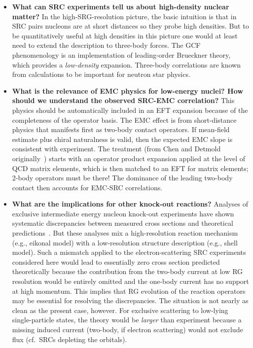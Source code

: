 \documentclass[10pt,aps,prc,floatfix,twocolumn,nofootinbib]{revtex4-1}
\begin{document}
\begin{itemize}
  \item\textbf{What can SRC experiments tell us about high-density nuclear matter?}
  In the high-SRG-resolution picture, the basic intuition is that in SRC pairs nucleons are at short distances so they probe high densities.
  But to be quantitatively useful at high densities in this picture one would at least need to extend the description to three-body forces.
  The GCF phenomenology is an implementation of leading-order Brueckner theory, which provides a \emph{low-density} expansion.
  Three-body correlations are known from calculations to be important for neutron star physics.
  
  \item\textbf{What is the relevance of EMC physics for low-energy nuclei? How should we understand the observed SRC-EMC correlation?} 
  This physics should be automatically included in an EFT expansion because of the completeness of the operator basis. 
  The EMC effect is from short-distance physics that manifests first as two-body contact operators. 
  If mean-field estimate plus chiral naturalness is valid, then the expected EMC slope is consistent with experiment. The treatment (from Chen and Detmold originally~\cite{Chen:2004zx,Chen:2016bde,Lynn:2019vwp}) starts with an operator product expansion applied at the level of QCD matrix elements, which is then matched to an EFT for matrix elements; 2-body operators must be there! 
  The dominance of the leading two-body contact then accounts for EMC-SRC correlations. 
  
  \item\textbf{What are the implications for other knock-out reactions?}
  Analyses of exclusive intermediate energy nucleon knock-out experiments have shown systematic discrepancies between measured cross sections and theoretical predictions~\cite{Tostevin:2014usa,Aumann:2020tcq}.
  But these analyses mix a high-resolution reaction mechanism (e.g., eikonal model) with a low-resolution structure description (e.g., shell model).
  Such a mismatch applied to the electron-scattering SRC experiments considered here would lead to essentially zero cross section predicted theoretically because the contribution from the two-body current at low RG resolution would be entirely omitted and the one-body current has no support at high momentum.
  This implies that RG evolution of the reaction operators may be essential for resolving the discrepancies.
  The situation is not nearly as clean as the present case, however.
  For exclusive scattering to low-lying single-particle states, the theory would be \emph{larger} than experiment because a missing induced current (two-body, if electron scattering) would not exclude flux (cf.\ SRCs depleting the orbitals).

\end{itemize}
\end{document}
